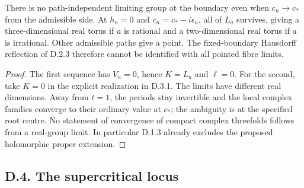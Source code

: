 \begin{corollary}[D.3.2; Proved]
There is no path-independent limiting group at the boundary even
when \(c_n\to c_*\) from the admissible side. At \(h_n=0\) and
\(c_n=c_*-i\epsilon_n\), all of \(L_a\) survives, giving a
three-dimensional real torus if \(a\) is rational and a
two-dimensional real torus if \(a\) is irrational. Other admissible
paths give a point. The fixed-boundary Hausdorff reflection of D.2.3
therefore cannot be identified with all pointed fibre limits.
\end{corollary}
\begin{proof}
The first sequence has \(V_n=0\), hence \(K=L_a\) and \(\ell=0\).
For the second, take \(K=0\) in the explicit realization in D.3.1.
The limits have different real dimensions. Away from \(t=1\), the
periods stay invertible and the local complex families converge to
their ordinary value at \(c_*\); the ambiguity is at the specified
root centre. No statement of convergence of compact complex
threefolds follows from a real-group limit. In particular D.1.3
already excludes the proposed holomorphic proper extension.
\end{proof}

\subsection{D.4. The supercritical locus}


